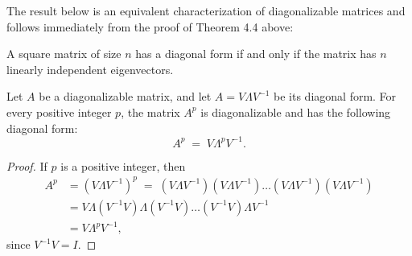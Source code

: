 %
%

The result below is an equivalent characterization of diagonalizable matrices and
follows immediately from the proof of Theorem 4.4 above:

\begin{theorem}
A square matrix of size $n$ has a diagonal form if and only if the matrix has $n$
linearly independent eigenvectors.
\end{theorem}

\begin{lemma}
Let $A$ be a diagonalizable matrix, and let $A = V\Lambda V^{-1}$ be its diagonal
form. For every positive integer $p$, the matrix $A^p$ is diagonalizable and has the
following diagonal form:
\begin{equation}
A^p \;=\; V\Lambda^p V^{-1}.
\end{equation}
\end{lemma}

\begin{proof}
If $p$ is a positive integer, then
\begin{equation}
\begin{split}
A^p &= (V\Lambda V^{-1})^p \;=\; (V\Lambda V^{-1})(V\Lambda V^{-1}) \dots (V\Lambda
V^{-1})(V\Lambda V^{-1})\\
&= V\Lambda (V^{-1}V) \Lambda (V^{-1}V) \dots (V^{-1}V) \Lambda V^{-1}\\
&= V\Lambda^p V^{-1},
\end{split}
\end{equation}
since $V^{-1}V = I$.
\end{proof}

